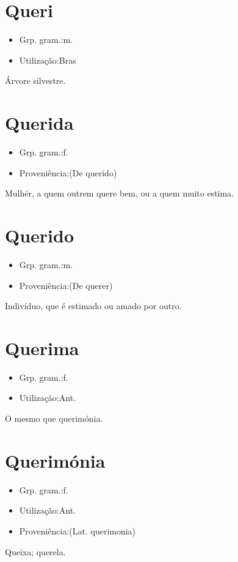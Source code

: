 \section{Queri}
\begin{itemize}
\item {Grp. gram.:m.}
\end{itemize}
\begin{itemize}
\item {Utilização:Bras}
\end{itemize}
Árvore silvestre.
\section{Querida}
\begin{itemize}
\item {Grp. gram.:f.}
\end{itemize}
\begin{itemize}
\item {Proveniência:(De \textunderscore querido\textunderscore )}
\end{itemize}
Mulhér, a quem outrem quere bem, ou a quem muito estima.
\section{Querido}
\begin{itemize}
\item {Grp. gram.:m.}
\end{itemize}
\begin{itemize}
\item {Proveniência:(De \textunderscore querer\textunderscore )}
\end{itemize}
Indivíduo, que é estimado ou amado por outro.
\section{Querima}
\begin{itemize}
\item {Grp. gram.:f.}
\end{itemize}
\begin{itemize}
\item {Utilização:Ant.}
\end{itemize}
O mesmo que \textunderscore querimónia\textunderscore .
\section{Querimónia}
\begin{itemize}
\item {Grp. gram.:f.}
\end{itemize}
\begin{itemize}
\item {Utilização:Ant.}
\end{itemize}
\begin{itemize}
\item {Proveniência:(Lat. \textunderscore querimonia\textunderscore )}
\end{itemize}
Queixa; querela.
